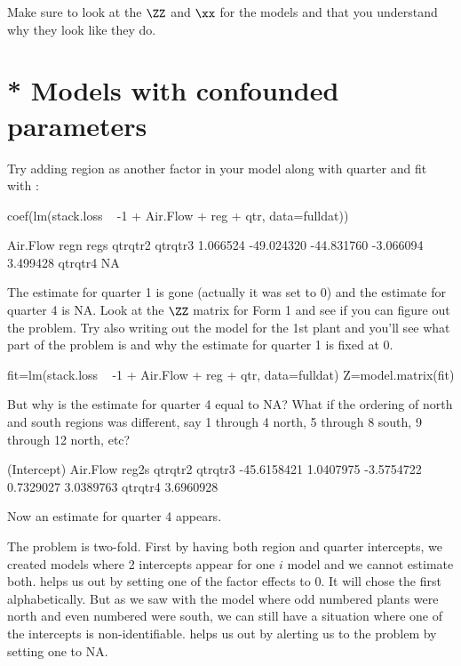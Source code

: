 Make sure to look at the $\ZZ$ and $\xx$ for the models and that you understand why they look like they do.

\section{* Models with confounded parameters}

Try adding region as another factor in your model along with quarter and fit with \verb@lm@:
\begin{Schunk}
\begin{Sinput}
 coef(lm(stack.loss ~ -1 + Air.Flow + reg + qtr, data=fulldat))
\end{Sinput}
\begin{Soutput}
  Air.Flow       regn       regs    qtrqtr2    qtrqtr3 
  1.066524 -49.024320 -44.831760  -3.066094   3.499428 
   qtrqtr4 
        NA 
\end{Soutput}
\end{Schunk}
The estimate for quarter 1 is gone (actually it was set to 0) and the estimate for quarter 4 is NA.  Look at the $\ZZ$ matrix for Form 1 and see if you can figure out the problem.  Try also writing out the model for the 1st plant and you'll see what part of the problem is and why the estimate for quarter 1 is fixed at 0.  
\begin{Schunk}
\begin{Sinput}
 fit=lm(stack.loss ~ -1 + Air.Flow + reg + qtr, data=fulldat)
 Z=model.matrix(fit)
\end{Sinput}
\end{Schunk}
But why is the estimate for quarter 4 equal to NA?  What if the ordering of north and south regions was different, say 1 through 4 north, 5 through 8 south, 9 through 12 north, etc?
\begin{Schunk}
\begin{Soutput}
(Intercept)    Air.Flow       reg2s     qtrqtr2     qtrqtr3 
-45.6158421   1.0407975  -3.5754722   0.7329027   3.0389763 
    qtrqtr4 
  3.6960928 
\end{Soutput}
\end{Schunk}
Now an estimate for quarter 4 appears.

The problem is two-fold.  First by having both region and quarter intercepts, we created models where 2 intercepts appear for one $i$ model and we cannot estimate both.  \verb@lm@ helps us out by setting one of the factor effects to 0.  It will chose the first alphabetically. But as we saw with the model where odd numbered plants were north and even numbered were south, we can still have a situation where one of the intercepts is non-identifiable.  \verb@lm@ helps us out by alerting us to the problem by setting one to NA.  

